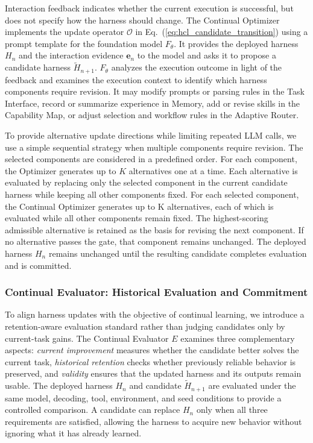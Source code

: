 \documentclass{article}
\begin{document}
Interaction feedback indicates whether the current execution is successful, but
does not specify how the harness should change. The Continual
Optimizer implements the update operator $\mathcal{O}$ in
Eq.~(\ref{eq:hcl_candidate_transition}) using a prompt template for the
foundation model $F_\theta$. It provides the deployed harness $H_n$ and the
interaction evidence $\mathbf{e}_n$ to the model and asks it to propose a
candidate harness $\widetilde{H}_{n+1}$.
$F_\theta$ analyzes the execution outcome in light of the feedback and examines the execution context to identify which harness components require revision. It may modify prompts or parsing rules in the Task Interface, record or summarize experience in Memory, add or revise skills in the Capability Map, or adjust selection and workflow rules in the Adaptive Router.


To provide alternative update directions while limiting repeated LLM calls, we
use a simple sequential strategy when multiple components require revision. The
selected components are considered in a predefined order. For each component,
the Optimizer generates up to $K$ alternatives one at a time. Each alternative is evaluated by replacing only the selected component in the current candidate harness while keeping all other components fixed. For each selected component, the Continual Optimizer generates up to K alternatives, each of which is evaluated while all other components remain fixed. The highest-scoring admissible alternative is retained as the basis for revising the next component. If no alternative passes the gate, that component remains unchanged. The deployed harness
$H_n$ remains unchanged until the resulting candidate completes evaluation and
is committed.


\subsubsection{Continual Evaluator: Historical Evaluation and Commitment}
\label{sec:continual_evaluator}

To align harness updates with the objective of continual learning, we
introduce a retention-aware evaluation standard rather than judging candidates
only by current-task gains. The Continual Evaluator $E$ examines three
complementary aspects: \emph{current improvement} measures whether the candidate
better solves the current task, \emph{historical retention} checks whether
previously reliable behavior is preserved, and \emph{validity} ensures that the
updated harness and its outputs remain usable. The deployed harness $H_n$ and
candidate $\widetilde{H}_{n+1}$ are evaluated under the same model, decoding,
tool, environment, and seed conditions to provide a controlled comparison. A
candidate can replace $H_n$ only when all three requirements are satisfied,
allowing the harness to acquire new behavior without ignoring what it has
already learned.
\end{document}
